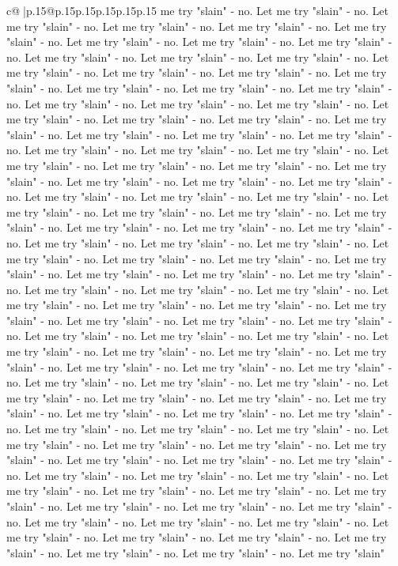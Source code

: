 \documentclass{article}
\begin{document}
{\begin{supertabular}{c@{$\;$}|p{.15\linewidth}@{}p{.15\linewidth}p{.15\linewidth}p{.15\linewidth}p{.15\linewidth}p{.15\linewidth}}
{{{me try "slain" {-} no. Let me try "slain" {-} no. Let me try "slain" {-} no. Let me try "slain" {-} no. Let me try "slain" {-} no. Let me try "slain" {-} no. Let me try "slain" {-} no. Let me try "slain" {-} no. Let me try "slain" {-} no. Let me try "slain" {-} no. Let me try "slain" {-} no. Let me try "slain" {-} no. Let me try "slain" {-} no. Let me try "slain" {-} no. Let me try "slain" {-} no. Let me try "slain" {-} no. Let me try "slain" {-} no. Let me try "slain" {-} no. Let me try "slain" {-} no. Let me try "slain" {-} no. Let me try "slain" {-} no. Let me try "slain" {-} no. Let me try "slain" {-} no. Let me try "slain" {-} no. Let me try "slain" {-} no. Let me try "slain" {-} no. Let me try "slain" {-} no. Let me try "slain" {-} no. Let me try "slain" {-} no. Let me try "slain" {-} no. Let me try "slain" {-} no. Let me try "slain" {-} no. Let me try "slain" {-} no. Let me try "slain" {-} no. Let me try "slain" {-} no. Let me try "slain" {-} no. Let me try "slain" {-} no. Let me try "slain" {-} no. Let me try "slain" {-} no. Let me try "slain" {-} no. Let me try "slain" {-} no. Let me try "slain" {-} no. Let me try "slain" {-} no. Let me try "slain" {-} no. Let me try "slain" {-} no. Let me try "slain" {-} no. Let me try "slain" {-} no. Let me try "slain" {-} no. Let me try "slain" {-} no. Let me try "slain" {-} no. Let me try "slain" {-} no. Let me try "slain" {-} no. Let me try "slain" {-} no. Let me try "slain" {-} no. Let me try "slain" {-} no. Let me try "slain" {-} no. Let me try "slain" {-} no. Let me try "slain" {-} no. Let me try "slain" {-} no. Let me try "slain" {-} no. Let me try "slain" {-} no. Let me try "slain" {-} no. Let me try "slain" {-} no. Let me try "slain" {-} no. Let me try "slain" {-} no. Let me try "slain" {-} no. Let me try "slain" {-} no. Let me try "slain" {-} no. Let me try "slain" {-} no. Let me try "slain" {-} no. Let me try "slain" {-} no. Let me try "slain" {-} no. Let me try "slain" {-} no. Let me try "slain" {-} no. Let me try "slain" {-} no. Let me try "slain" {-} no. Let me try "slain" {-} no. Let me try "slain" {-} no. Let me try "slain" {-} no. Let me try "slain" {-} no. Let me try "slain" {-} no. Let me try "slain" {-} no. Let me try "slain" {-} no. Let me try "slain" {-} no. Let me try "slain" {-} no. Let me try "slain" {-} no. Let me try "slain" {-} no. Let me try "slain" {-} no. Let me try "slain" {-} no. Let me try "slain" {-} no. Let me try "slain" {-} no. Let me try "slain" {-} no. Let me try "slain" {-} no. Let me try "slain" {-} no. Let me try "slain" {-} no. Let me try "slain" {-} no. Let me try "slain" {-} no. Let me try "slain" {-} no. Let me try "slain" {-} no. Let me try "slain" {-} no. Let me try "slain" {-} no. Let me try "slain" {-} no. Let me try "slain" {-} no. Let me try "slain" {-} no. Let me try "slain" {-} no. Let me try "slain" {-} no. Let me try "slain" {-} no. Let me try "slain" {-} no. Let me try "slain" {-} no. Let me try "slain" {-} no. Let me try "slain" {-} no. Let me try "slain" {-} no. Let me try "slain" {-} no. Let me try "slain" {-} no. Let me try "slain" {-} no. Let me try "slain" {-} no. Let me try "slain" {-} no. Let me try "slain" {-} no. Let me try "slain" }}}
\end{supertabular}}
\end{document}
